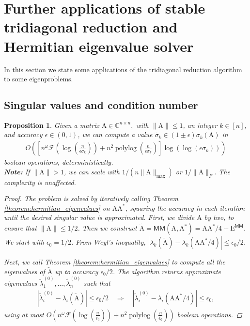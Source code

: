 \documentclass{article}
\newcommand{\labs}{\left|}
\newcommand{\rabs}{\right|}
\newcommand{\lbrac}{\left[}
\newcommand{\rbrac}{\right]}
\newcommand{\lpar}{\left(}
\newcommand{\rpar}{\right)}
\newtheorem{proposition}{Proposition}[section]
\DeclareMathOperator{\polylog}{polylog}
\newcommand\matA{\boldsymbol{\mathrm{A}}}
\newcommand\matE{\boldsymbol{\mathrm{E}}}
\newcommand\matAtilde{\widetilde{\boldsymbol{\mathrm{A}}}}
\newcommand{\MM}{\mathsf{MM}}
\newcommand{\flopcost}{\mathcal{F}}
\begin{document}
\section{Further applications of stable tridiagonal reduction and Hermitian eigenvalue solver}
\label{section:applications_tridiagonal_reduction}
In this section we state some applications of the tridiagonal reduction algorithm to some eigenproblems.


\subsection{Singular values and condition number}
\begin{proposition}
    \label{proposition:alg_sigmak}
        Given a matrix $\matA\in\mathbb{C}^{n\times n},$ with $\|\matA\|\leq 1$, an integer $k\in[n]$, and accuracy $\epsilon\in(0,1)$, we can compute a value $\widetilde\sigma_{k}\in (1\pm\epsilon)\sigma_k(\matA)$ in
        \begin{align*}
            O\lpar
                \lbrac
                    n^{\omega}\flopcost(\log(\tfrac{n}{\epsilon\sigma_k}))
                    +
                    n^2\polylog(\tfrac{n}{\epsilon\sigma_k})
                \rbrac
                \log(\log(\epsilon\sigma_k))
            \rpar
        \end{align*}
        boolean operations, deterministically.\\
        \textbf{Note:} If $\|\matA\|>1$, we can scale with $1/(n\|\matA\|_{\max})$ or $1/\|\matA\|_F$. The complexity is unaffected. 
    \begin{proof}
    The problem is solved by iteratively calling Theorem \ref{theorem:hermitian_eigenvalues} on $\matA\matA^*$, squaring the accuracy in each iteration until the desired singular value is approximated. 
    First, we divide $\matA$ by two, to ensure that $\|\matA\|\leq 1/2$. Then we construct $\matAtilde=  \MM(\matA,\matA^*)=\matA\matA^*/4+\matE^{ \MM}$. 
    We start with $\epsilon_0=1/2$. 
    From Weyl's inequality, $|\lambda_k(\matAtilde)-\lambda_k(\matA\matA^*/4)| \leq \epsilon_0/2$.

    Next, we call Theorem \ref{theorem:hermitian_eigenvalues} to compute all the eigenvalues of $\matAtilde$ up to accuracy $\epsilon_0/2$. The algorithm returns approximate eigenvalues $\widetilde\lambda_1^{(0)},\ldots,\widetilde\lambda_n^{(0)}$ such that
    \begin{align*}
        \labs \widetilde\lambda_i^{(0)} - \lambda_i(\matAtilde) \rabs
        \leq
        \epsilon_0/2
        \quad
        \Rightarrow
        \quad
        \labs \widetilde\lambda_i^{(0)} - \lambda_i(\matA\matA^*/4)
        \rabs \leq \epsilon_0,
    \end{align*}
    using at most 
    $
        O\lpar
            n^\omega \flopcost(\log(\tfrac{n}{\epsilon_0}))
            +
            n^2\polylog(\tfrac{n}{\epsilon_0})
        \rpar
    $
    boolean operations. 
    

\end{proof}
\end{proposition}
\end{document}
